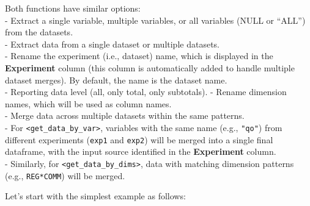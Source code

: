 \documentclass[
]{article}
\begin{document}
Both functions have similar options:\\
- Extract a single variable, multiple variables, or all variables (NULL
or ``ALL'') from the datasets.\\
- Extract data from a single dataset or multiple datasets.\\
- Rename the experiment (i.e., dataset) name, which is displayed in the
\textbf{Experiment} column (this column is automatically added to handle
multiple dataset merges). By default, the name is the dataset name.\\
- Reporting data level (all, only total, only subtotals). - Rename
dimension names, which will be used as column names.\\
- Merge data across multiple datasets within the same patterns.\\
- For \texttt{\textless{}get\_data\_by\_var\textgreater{}}, variables
with the same name (e.g., \texttt{"qo"}) from different experiments
(\texttt{exp1} and \texttt{exp2}) will be merged into a single final
dataframe, with the input source identified in the \textbf{Experiment}
column.\\
- Similarly, for \texttt{\textless{}get\_data\_by\_dims\textgreater{}},
data with matching dimension patterns (e.g., \texttt{REG*COMM}) will be
merged.

Let's start with the simplest example as follows:
\end{document}
